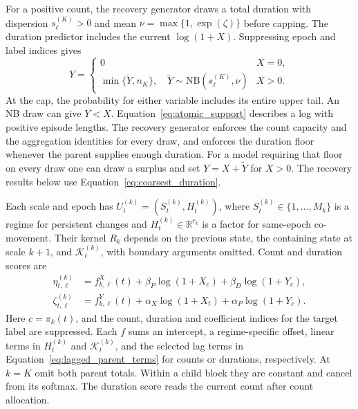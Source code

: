 \documentclass[sigconf]{acmart}
\begin{document}
For a positive count, the recovery generator draws a total duration with dispersion \(s_\ell^{(K)}>0\) and mean \(\nu=\max\{1,\exp(\zeta)\}\) before capping. The duration predictor includes the current \(\log(1+X)\). Suppressing epoch and label indices gives
\begin{equation}
 Y=\begin{cases}0 & X=0,\\
 \min\{\widetilde Y,n_K\},\quad \widetilde Y\sim\mathrm{NB}(s_\ell^{(K)},\nu) & X>0 .
 \end{cases}
 \label{eq:coarsest_duration}
\end{equation}
At the cap, the probability for either variable includes its entire upper tail. An NB draw can give \(Y<X\). Equation~\eqref{eq:atomic_support} describes a log with positive episode lengths. The recovery generator enforces the count capacity and the aggregation identities for every draw, and enforces the duration floor whenever the parent supplies enough duration. For a model requiring that floor on every draw one can draw a surplus and set \(Y=X+\widetilde Y\) for \(X>0\). The recovery results below use Equation~\eqref{eq:coarsest_duration}.

Each scale and epoch has \(U_t^{(k)}=(S_t^{(k)},H_t^{(k)})\), where \(S_t^{(k)}\in\{1,\ldots,M_k\}\) is a regime for persistent changes and \(H_t^{(k)}\in\mathbb R^{r_k}\) is a factor for same-epoch co-movement. Their kernel \(R_k\) depends on the previous state, the containing state at scale \(k+1\), and \(\mathcal K_t^{(k)}\), with boundary arguments omitted. Count and duration scores are
\begin{equation}
  \begin{aligned}
    \eta_{t,\ell}^{(k)} &= f^X_{k,\ell}(t)
       +\beta_P\log(1+X_c)+\beta_D\log(1+Y_c),\\
    \zeta_{t,\ell}^{(k)} &= f^Y_{k,\ell}(t)
       +\alpha_X\log(1+X_t)+\alpha_P\log(1+Y_c).
  \end{aligned}
  \label{eq:predictor_scores}
\end{equation}
Here \(c=\pi_k(t)\), and the count, duration and coefficient indices for the target label are suppressed. Each \(f\) sums an intercept, a regime-specific offset, linear terms in \(H_t^{(k)}\) and \(\mathcal K_t^{(k)}\), and the selected lag terms in Equation~\eqref{eq:lagged_parent_terms} for counts or durations, respectively. At \(k=K\) omit both parent totals. Within a child block they are constant and cancel from its softmax. The duration score reads the current count after count allocation.
\end{document}
